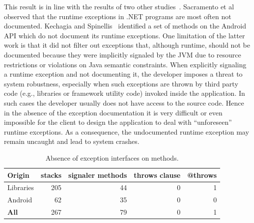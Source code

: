 This result is in line with the results of two other studies~\cite{sacramento2006unchecked,kechagia2014}. 
Sacramento et al~\cite{sacramento2006unchecked} observed that the
runtime exceptions in .NET programs are most often not documented. 
Kechagia and Spinellis~\cite{kechagia2014} identified a set of methods 
on the Android API which do not document its runtime exceptions. One limitation 
of the latter work is that it did not filter out exceptions that,  
although runtime, should not be documented because they were implicitly signaled by the 
JVM due to resource restrictions or violations on Java semantic constraints.
When explicitly signaling a runtime exception and not documenting it, 
the developer imposes a threat to system robustness, especially
when such exceptions are thrown by third party code (e.g., libraries or framework utility code)
 invoked inside the application. In such cases the developer usually does not have access to 
the source code. Hence in the absence of the exception documentation it is very difficult or even impossible
 for the client to design the application to deal with ``unforeseen'' runtime exceptions. As a consequence, the
 undocumented runtime exception may remain uncaught and lead to system crashes.



\begin{table}
\centering

\begin{tabular}{lrrrr}
    \hline
 \bfseries{Origin}   &  \bfseries{stacks}  & \bfseries{signaler methods} &  \bfseries{throws clause}  &  \bfseries{@throws}  \\ 
\hline					
Libraries	& 	205	 & 	44	& 0	& 1	\\
Android  	&	62 &	35	&0 &  0	\\					
\hline					
\bfseries{All}	&	267 &	79 &  0  & 1\\
\hline					
  \end{tabular}
\caption{Absence of exception interfaces on methods.}
\label{tab:runtimeinterface}
\end{table}

